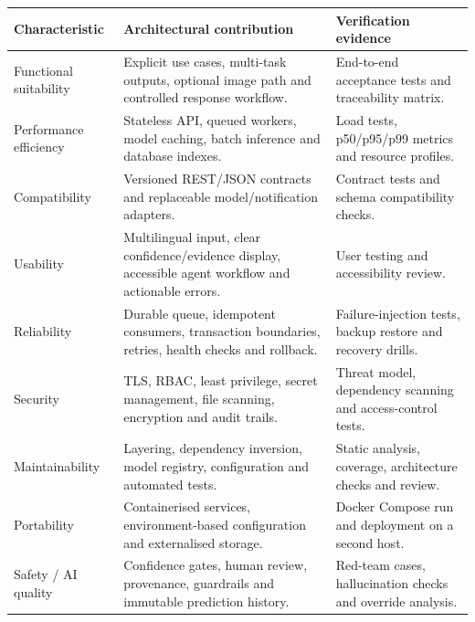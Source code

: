 \documentclass[10pt,letterpaper]{article}
\begin{document}
\begin{table}[H]\centering\small
\begin{tabularx}{\textwidth}{|L{1.35in}|Y|L{2.35in}|}\hline
\textbf{Characteristic} & \textbf{Architectural contribution} & \textbf{Verification evidence}\\\hline
Functional suitability & Explicit use cases, multi-task outputs, optional image path and controlled response workflow. & End-to-end acceptance tests and traceability matrix.\\\hline
Performance efficiency & Stateless API, queued workers, model caching, batch inference and database indexes. & Load tests, p50/p95/p99 metrics and resource profiles.\\\hline
Compatibility & Versioned REST/JSON contracts and replaceable model/notification adapters. & Contract tests and schema compatibility checks.\\\hline
Usability & Multilingual input, clear confidence/evidence display, accessible agent workflow and actionable errors. & User testing and accessibility review.\\\hline
Reliability & Durable queue, idempotent consumers, transaction boundaries, retries, health checks and rollback. & Failure-injection tests, backup restore and recovery drills.\\\hline
Security & TLS, RBAC, least privilege, secret management, file scanning, encryption and audit trails. & Threat model, dependency scanning and access-control tests.\\\hline
Maintainability & Layering, dependency inversion, model registry, configuration and automated tests. & Static analysis, coverage, architecture checks and review.\\\hline
Portability & Containerised services, environment-based configuration and externalised storage. & Docker Compose run and deployment on a second host.\\\hline
Safety / AI quality & Confidence gates, human review, provenance, guardrails and immutable prediction history. & Red-team cases, hallucination checks and override analysis.\\\hline
\end{tabularx}
\end{table}
\end{document}
